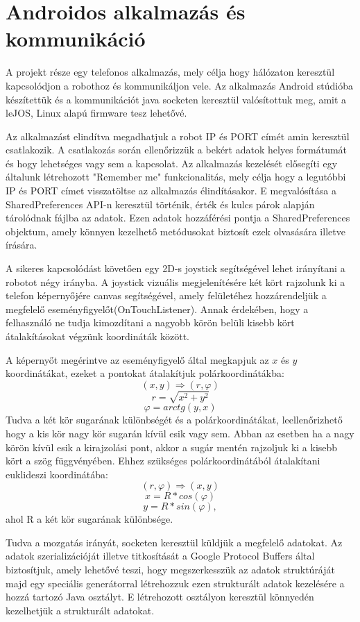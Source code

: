\section{Androidos alkalmazás és kommunikáció}\label{sec:MEGVALOSITAS:android}
A projekt része egy telefonos alkalmazás, mely célja hogy hálózaton keresztül kapcsolódjon a robothoz és kommunikáljon vele. Az alkalmazás Android stúdióba készítettük és a kommunikációt java socketen keresztül valósítottuk meg, amit a leJOS, Linux alapú firmware tesz lehetővé.

Az alkalmazást elindítva megadhatjuk a robot IP és PORT címét amin keresztül csatlakozik. A csatlakozás során ellenőrizzük a bekért adatok helyes formátumát és hogy lehetséges vagy sem a kapcsolat. Az alkalmazás kezelését elősegíti egy általunk létrehozott "Remember me" funkcionalitás, mely célja hogy a legutóbbi IP és PORT címet visszatöltse az alkalmazás élindításakor. E megvalósítása a SharedPreferences API-n keresztül történik, érték és kulcs párok alapján tárolódnak fájlba az adatok. Ezen adatok hozzáférési pontja a SharedPreferences objektum, amely könnyen kezelhető metódusokat biztosít ezek olvasására illetve írására.

A sikeres kapcsolódást követően egy 2D-s joystick segítségével lehet irányítani a robotot négy irányba. A joystick vizuális megjelenítésére két kört rajzolunk ki a telefon képernyőjére canvas segítségével, amely felületéhez hozzárendeljük a megfelelő eseményfigyelőt(OnTouchListener). Annak érdekében, hogy a felhasználó ne tudja kimozdítani a nagyobb körön belüli kisebb kört átalakításokat végzünk koordináták között.

A képernyőt megérintve az eseményfigyelő által megkapjuk az $x$ és $y$ koordinátákat, ezeket a pontokat átalakítjuk polárkoordinátákba: $$(x,y) \Longrightarrow (r,\varphi)$$ $$r=\sqrt{x^2+y^2}$$ $$\varphi=arctg(y,x)$$ Tudva a két kör sugarának különbségét és a polárkoordinátákat, leellenőrizhető hogy a kis kör nagy kör sugarán kívül esik vagy sem. Abban az esetben ha a nagy körön kívül esik a kirajzolási pont, akkor a sugár mentén rajzoljuk ki a kisebb kört a szög függvényében. Ehhez szükséges polárkoordinátából átalakítani euklideszi koordinátába:  $$(r,\varphi) \Longrightarrow (x,y)$$ $$x=R*cos(\varphi)$$ $$y=R*sin(\varphi),$$ ahol R a két kör sugarának különbsége.

Tudva a mozgatás irányát, socketen keresztül küldjük a megfelelő adatokat. Az adatok szerializációját illetve titkosítását a Google Protocol Buffers által biztosítjuk, amely lehetővé teszi, hogy megszerkesszük az adatok struktúráját majd egy speciális generátorral létrehozzuk ezen strukturált adatok kezelésére a hozzá tartozó Java osztályt. E létrehozott osztályon keresztül könnyedén kezelhetjük a strukturált adatokat.

